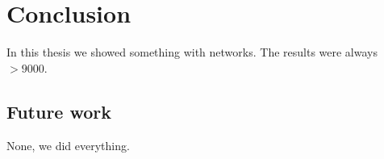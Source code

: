 \chapter{Conclusion}
\label{chap:conclusion}

In this thesis we showed something with networks. The results were always $>9000$.

\section{Future work}

None, we did everything.
